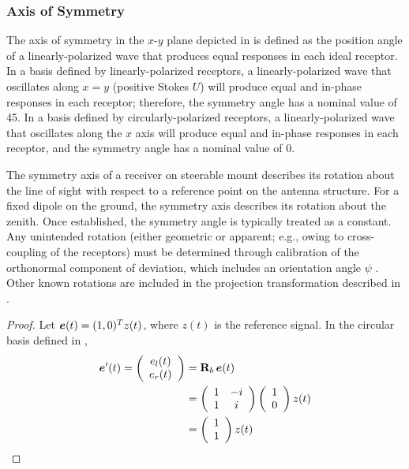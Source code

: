 
\subsubsection{Axis of Symmetry}
\label{sec:symmetry}

The axis of symmetry in the $x$-$y$ plane depicted in  is defined as the
position angle of a linearly-polarized wave that produces equal responses
in each ideal receptor.
%
In a basis defined by linearly-polarized receptors, a linearly-polarized wave that oscillates along 
$x = y$ (positive Stokes $U$) will produce
equal and in-phase responses in each receptor; therefore, the symmetry angle has a nominal value of 45\deg.
%
In a basis defined by circularly-polarized receptors, a linearly-polarized wave that oscillates along the $x$ axis will produce equal and in-phase responses in each receptor, and the symmetry angle has a nominal value of 0\deg.

The symmetry axis of a receiver on steerable mount describes its rotation about the line of sight with respect to a reference point on the antenna structure.  For a fixed dipole on the ground, the symmetry axis describes its rotation about the zenith.  Once established, the symmetry angle is typically treated as a constant.  Any unintended rotation (either geometric or apparent; e.g.,  owing to cross-coupling of the receptors) must be determined through calibration of the orthonormal component of deviation, which includes an orientation angle $\psi$ . Other known rotations are
included in the projection transformation described in .

\iffalse

\begin{proof}
\label{proof:reference_phase}
Let $\mbox{\boldmath $e$}(t)=(1,0)^T z(t)$, where $z(t)$ is the reference signal.
In the circular basis defined in ,
\begin{align*}
\Jcol{e}'(t) 
=     \left( \begin{array}{c}
      e_l(t) \\
      e_r(t)
    \end{array} \right) 
& = \JM{R}_b \, \Jcol{e}(t) \\
&= \left( \begin{array}{cc}
      1 & -i \\
      1 & i
    \end{array} \right) 
    \left( \begin{array}{c}
     1 \\
     0
    \end{array} \right) z(t) \\
%
&=
    \left( \begin{array}{c}
     1 \\
     1
    \end{array} \right) z(t)
\end{align*}
\end{proof}

